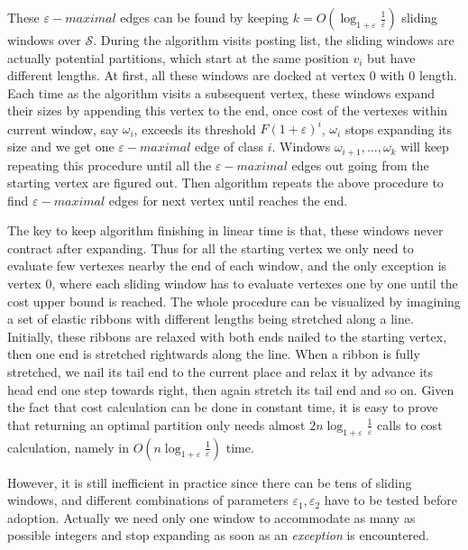 \documentclass[runningheads,a4paper]{llncs}
\begin{document}
These $\varepsilon-maximal$ edges can be found by keeping $k = O\left(\log_{1+\varepsilon}\frac{1}{\varepsilon}\right)$ sliding windows over $\mathcal{S}$.
During the algorithm visits posting list, the sliding windows are actually potential partitions, which start at the same position $ v_{i} $ but have different lengths.
At first, all these windows are docked at vertex 0 with 0 length.
Each time as the algorithm visits a subsequent vertex, these windows expand their sizes by appending this vertex to the end, once cost of the vertexes within current window, say $ \omega_{i} $, exceeds its threshold $ F \left( 1 + \varepsilon \right) ^{i} $, $ \omega_{i} $ stops expanding its size and we get one $\varepsilon-maximal$ edge of class $ i $.
Windows $ \omega_{i+1}, \dots, \omega_{k}$ will keep repeating this procedure until all the $\varepsilon-maximal$ edges out going from the starting vertex are figured out.
Then algorithm repeats the above procedure to find $\varepsilon-maximal$ edges for next vertex until reaches the end.

The key to keep algorithm finishing in linear time is that, these windows never contract after expanding.
Thus for all the starting vertex we only need to evaluate few vertexes nearby the end of each window, and the only exception is vertex 0, where each sliding window has to evaluate vertexes one by one until the cost upper bound is reached.
The whole procedure can be visualized by imagining a set of elastic ribbons with different lengths being stretched along a line.
Initially, these ribbons are relaxed with both ends nailed to the starting vertex, then one end is stretched rightwards along the line.
When a ribbon is fully stretched, we nail its tail end to the current place and relax it by advance its head end one step towards right, then again stretch its tail end and so on.
Given the fact that cost calculation can be done in constant time, it is easy to prove that returning an optimal partition only needs almost $ 2n\log_{1+\varepsilon}\frac{1}{\varepsilon} $ calls to cost calculation, namely in $O\left(n\log_{1+\varepsilon}\frac{1}{\varepsilon}\right)$ time.

However, it is still inefficient in practice since there can be tens of sliding windows, and different combinations of parameters $ \varepsilon_1,\varepsilon_2 $ have to be tested before adoption.
Actually we need only one window to accommodate as many as possible integers and stop expanding as soon as an \textit{exception} is encountered.
\end{document}
